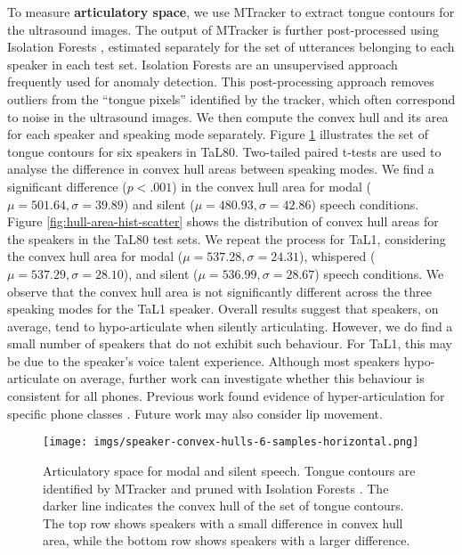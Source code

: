 \documentclass[a4paper]{article}
\begin{document}
To measure \textbf{articulatory space}, we use MTracker \cite{zhu2018automatic} to extract tongue contours for the ultrasound images.
The output of MTracker is further post-processed using Isolation Forests \cite{liu2008isolation}, estimated separately for the set of utterances belonging to each speaker in each test set.
Isolation Forests are an unsupervised approach frequently used for anomaly detection.
This post-processing approach removes outliers from the \enquote{tongue pixels} identified by the tracker, which often correspond to noise in the ultrasound images.
We then compute the convex hull and its area for each speaker and speaking mode separately.
Figure \ref{fig:hull-area-speaker-samples} illustrates the set of tongue contours for six speakers in TaL80.
Two-tailed paired t-tests are used to analyse the difference in convex hull areas between speaking modes.
We find a significant difference ($p < .001$) in the convex hull area for modal ($\mu=501.64, \sigma=39.89$) and silent ($\mu=480.93, \sigma=42.86$) speech conditions.
Figure \ref{fig:hull-area-hist-scatter} shows the distribution of convex hull areas for the speakers in the TaL80 test sets.
We repeat the process for TaL1, considering the convex hull area for modal ($\mu=537.28, \sigma=24.31$), whispered ($\mu=537.29, \sigma=28.10$), and silent ($\mu=536.99, \sigma=28.67$) speech conditions. We observe that the convex hull area is not significantly different across the three speaking modes for the TaL1 speaker.
Overall results suggest that speakers, on average, tend to hypo-articulate when silently articulating.
However, we do find a small number of speakers that do not exhibit such behaviour.
For TaL1, this may be due to the speaker's voice talent experience.
Although most speakers hypo-articulate on average, further work can investigate whether this behaviour is consistent for all phones.
Previous work found evidence of hyper-articulation for specific phone classes \cite{janke2010impact}.
Future work may also consider lip movement.


\begin{figure}[t]
  \centering
  \texttt{[image: imgs/speaker-convex-hulls-6-samples-horizontal.png]}
  \caption{Articulatory space for modal and silent speech. Tongue contours are identified by MTracker \cite{zhu2018automatic} and pruned with Isolation Forests \cite{liu2008isolation}. The darker line indicates the convex hull of the set of tongue contours. The top row shows speakers with a small difference in convex hull area, while the bottom row shows speakers with a larger difference.}
  \label{fig:hull-area-speaker-samples}
\end{figure}
\end{document}
